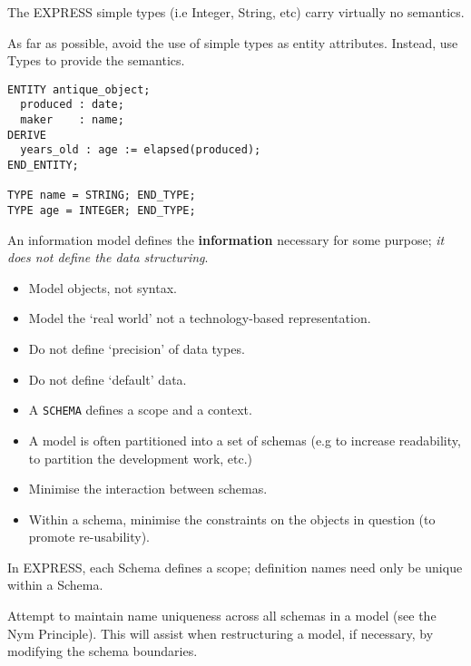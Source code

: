 
    The EXPRESS simple types (i.e Integer, String, etc) carry virtually no
semantics.

    As far as possible, avoid the use of simple types as entity attributes.
Instead, use Types to provide the semantics.
\begin{verbatim}
ENTITY antique_object;
  produced : date;
  maker    : name;
DERIVE
  years_old : age := elapsed(produced);
END_ENTITY;

TYPE name = STRING; END_TYPE;
TYPE age = INTEGER; END_TYPE;
\end{verbatim}



    An information model defines the \textbf{information} necessary for some
purpose; \emph{it does not define the data structuring}.

\begin{itemize}
\item Model objects, not syntax.
\item Model the `real world' not a technology-based representation.
\item Do not define `precision' of data types.
\item Do not define `default' data.
\end{itemize}


\begin{itemize}
\item A \verb?SCHEMA? defines a scope and a context.
\item A model is often partitioned into a set of schemas (e.g to increase
readability, to partition the development work, etc.)
\item Minimise the interaction between schemas.
\item Within a schema, minimise the constraints on the objects in question (to
      promote re-usability).
\end{itemize}



    In EXPRESS, each Schema defines a scope; definition names need only be
unique within a Schema.

    Attempt to maintain name uniqueness across all schemas in a model (see the
Nym Principle). This will assist when restructuring a model, if necessary,
by modifying the schema boundaries.


